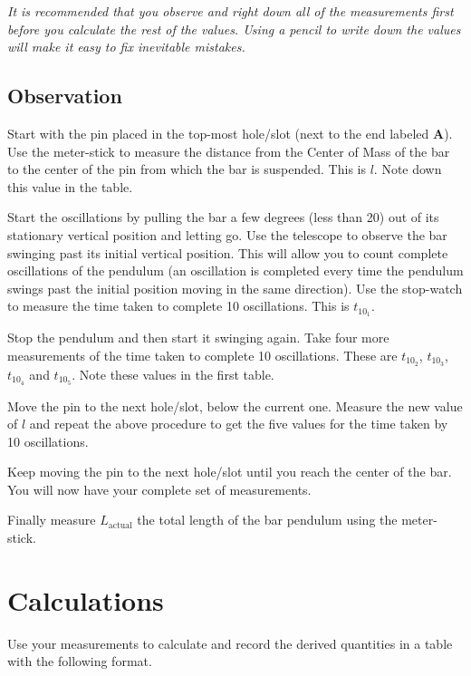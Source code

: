       \textit{It is recommended that you observe and right down all of the measurements first before you calculate the rest of the values. Using a pencil to write down the values will make it easy to fix inevitable mistakes.}

   \subsection*{Observation}

   Start with the pin placed in the top-most hole/slot (next to the end labeled \textbf{A}). Use the meter-stick to measure the distance from the Center of Mass of the bar to the center of the pin from which the bar is suspended. This is $l$. Note down this value in the table.

   Start the oscillations by pulling the bar a few degrees (less than 20) out of its stationary vertical position and letting go. Use the telescope to observe the bar swinging past its initial vertical position. This will allow you to count complete oscillations of the pendulum (an oscillation is completed every time the pendulum swings past the initial position moving in the same direction). Use the stop-watch to measure the time taken to complete 10 oscillations. This is $t_{10_1}$.

   Stop the pendulum and then start it swinging again. Take four more measurements of the time taken to complete 10 oscillations. These are $t_{10_2}$, $t_{10_3}$, $t_{10_4}$ and $t_{10_5}$. Note these values in the first table.

   Move the pin to the next hole/slot, below the current one. Measure the new value of $l$ and repeat the above procedure to get the five values for the time taken by 10 oscillations.

   Keep moving the pin to the next hole/slot until you reach the center of the bar. You will now have your complete set of measurements.

   Finally measure $L_\text{actual}$ the total length of the bar pendulum using the meter-stick.


\section*{Calculations}

   Use your measurements to calculate and record the derived quantities in a table with the following format.
   
